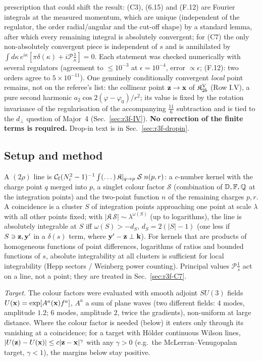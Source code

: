 prescription that could shift the result: (C3), (6.15) and (F.12) are Fourier integrals at the measured momentum, which are unique (independent of the regulator, the order radial/angular and the cut-off shape) by a standard lemma, after which every remaining integral is absolutely convergent; for (C7) the only non-absolutely convergent piece is independent of $s$ and is annihilated by $\int d\kappa\,e^{i\kappa}[\pi\delta(\kappa)+i\mathcal P\frac1\kappa]=0$. Each statement was checked numerically with several regulators (agreement to $\le10^{-3}$ at $\epsilon=10^{-4}$, error $\propto\epsilon$; (F.12): two orders agree to $5\times10^{-11}$). One genuinely conditionally convergent \emph{local} point remains, not on the referee's list: the collinear point $\mathbf{z}\to\mathbf{x}$ of $\mathfrak K^{\rm V}_{2b}$ (Row I.V), a pure second harmonic $a_2\cos2(\varphi-\varphi_0)/r^2$; its value is fixed by the rotation invariance of the regularisation of the accompanying $\frac{11}{6}$ subtraction and is tied to the $d_\perp$ question of Major~4 (Sec.~\ref{sec:r3f-IV}). \textbf{No correction of the finite terms is required.} Drop-in text is in Sec.~\ref{sec:r3f-dropin}.

\subsection{Setup and method}\label{sec:r3f-setup}
\noindent A $(2\rho)$ line is $\mathcal C_{\rm f}(N_c^2-1)^{-1}\int(\dots)\,\mathfrak K|_{q\to p}\;\mathcal S\;n(p,r)$: a $c$-number kernel with the charge point $q$ merged into $p$, a singlet colour factor $\mathcal S$ (combination of $\mathbb{D},\mathbb{F},\mathbb{Q}$ at the integration points) and the two-point function $n$ of the remaining charges $p,r$. A coincidence is a cluster $S$ of integration points approaching one point at scale $\lambda$ with all other points fixed; with $|\mathfrak K\,\mathcal S|\sim\lambda^{\omega(S)}$ (up to logarithms), the line is absolutely integrable at $S$ iff $\omega(S)>-d_S$, $d_S=2(|S|-1)$ (one less if $S\ni\mathbf{z},\mathbf{y}'$ in a $\delta(s)$ term, where $\mathbf{y}'-\mathbf{z}\perp\mathbf{k}$). For kernels that are products of homogeneous functions of point differences, logarithms of ratios and bounded functions of $s$, absolute integrability at all clusters is sufficient for local integrability (Hepp sectors / Weinberg power counting). Principal values $\mathcal P\frac1s$ act on a line, not a point; they are treated in Sec.~\ref{sec:r3f-C7}.

\noindent\emph{Target.} The colour factors were evaluated with smooth adjoint $SU(3)$ fields $U(\mathbf{x})=\exp[A^a(\mathbf{x})f^a]$, $A^a$ a sum of plane waves (two different fields: 4 modes, amplitude $1.2$; 6 modes, amplitude $2$, twice the gradients), non-uniform at large distance. Where the colour factor is needed (below) it enters only through its vanishing at a coincidence; for a target with H\"older continuous Wilson lines, $|U(\mathbf{z})-U(\mathbf{x})|\le c|\mathbf{z}-\mathbf{x}|^\gamma$ with any $\gamma>0$ (e.g.\ the McLerran--Venugopalan target, $\gamma<1$), the margins below stay positive.

